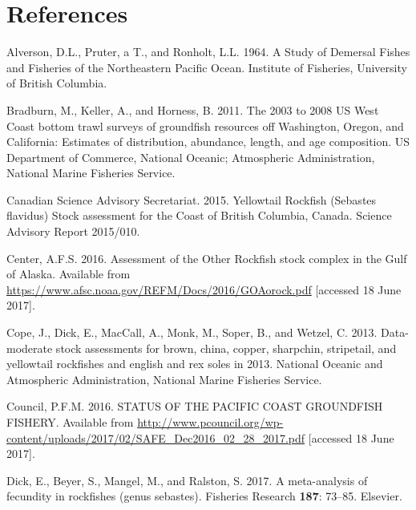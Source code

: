 \documentclass[12pt,]{article}
\begin{document}
\FloatBarrier

\newpage

\color{black}

\section{References}\label{references}

\renewcommand{\thepage}{}





\hypertarget{refs}{}
\hypertarget{ref-Alverson1964}{}
Alverson, D.L., Pruter, a T., and Ronholt, L.L. 1964. A Study of
Demersal Fishes and Fisheries of the Northeastern Pacific Ocean.
Institute of Fisheries, University of British Columbia.

\hypertarget{ref-Bradburn2011}{}
Bradburn, M., Keller, A., and Horness, B. 2011. The 2003 to 2008 US West
Coast bottom trawl surveys of groundfish resources off Washington,
Oregon, and California: Estimates of distribution, abundance, length,
and age composition. US Department of Commerce, National Oceanic;
Atmospheric Administration, National Marine Fisheries Service.

\hypertarget{ref-DFO2015}{}
Canadian Science Advisory Secretariat. 2015. Yellowtail Rockfish
(Sebastes flavidus) Stock assessment for the Coast of British Columbia,
Canada. Science Advisory Report 2015/010.

\hypertarget{ref-AFSC2016}{}
Center, A.F.S. 2016. Assessment of the Other Rockfish stock complex in
the Gulf of Alaska. Available from
\url{https://www.afsc.noaa.gov/REFM/Docs/2016/GOAorock.pdf} {[}accessed
18 June 2017{]}.

\hypertarget{ref-Cope2013}{}
Cope, J., Dick, E., MacCall, A., Monk, M., Soper, B., and Wetzel, C.
2013. Data-moderate stock assessments for brown, china, copper,
sharpchin, stripetail, and yellowtail rockfishes and english and rex
soles in 2013. National Oceanic and Atmospheric Administration, National
Marine Fisheries Service.

\hypertarget{ref-PFMC2016}{}
Council, P.F.M. 2016. STATUS OF THE PACIFIC COAST GROUNDFISH FISHERY.
Available from
\url{http://www.pcouncil.org/wp-content/uploads/2017/02/SAFE_Dec2016_02_28_2017.pdf}
{[}accessed 18 June 2017{]}.

\hypertarget{ref-Dick2017}{}
Dick, E., Beyer, S., Mangel, M., and Ralston, S. 2017. A meta-analysis
of fecundity in rockfishes (genus sebastes). Fisheries Research
\textbf{187}: 73--85. Elsevier.
\end{document}
